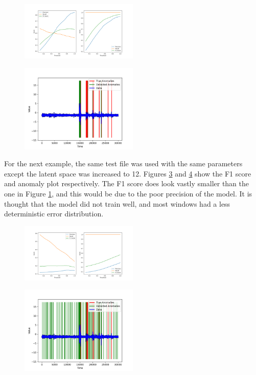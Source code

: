 \documentclass[conference]{IEEEtran}
\begin{document}
\begin{figure}[htbp]
    \centering
    \includegraphics[width=0.5\textwidth]{rf_fig_1.png}
    \caption{}
    \label{rf_fig_1}
\end{figure}

\begin{figure}[htbp]
    \centering
    \includegraphics[width=0.5\textwidth]{rf_fig_2.png}
    \caption{}
    \label{rf_fig_2}
\end{figure}

For the next example, the same test file was used with the same parameters except the latent space was increased to 12. Figures \ref{rf_fig_3} and \ref{rf_fig_4} show the F1 score and anomaly plot respectively. The F1 score does look vastly smaller than the one in Figure \ref{rf_fig_1}, and this would be due to the poor precision of the model. It is thought that the model did not train well, and most windows had a less deterministic error distribution. 

\begin{figure}[htbp]
    \centering
    \includegraphics[width=0.5\textwidth]{rf_fig_3.png}
    \caption{}
    \label{rf_fig_3}
\end{figure}

\begin{figure}[htbp]
    \centering
    \includegraphics[width=0.5\textwidth]{rf_fig_4.png}
    \caption{}
    \label{rf_fig_4}
\end{figure}
\end{document}
